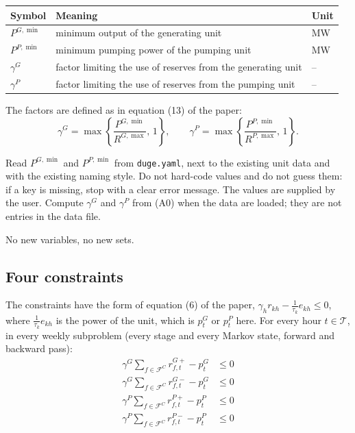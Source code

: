\documentclass[11pt,a4paper]{article}
\begin{document}
\begin{tabular}{@{}lll@{}}
\toprule
Symbol & Meaning & Unit\\
\midrule
$P^{G,\min}$ & minimum output of the generating unit & MW\\
$P^{P,\min}$ & minimum pumping power of the pumping unit & MW\\
$\gamma^G$ & factor limiting the use of reserves from the generating unit & --\\
$\gamma^P$ & factor limiting the use of reserves from the pumping unit & --\\
\bottomrule
\end{tabular}

The factors are defined as in equation (13) of the paper:
\begin{equation}
\gamma^G=\max\left\{\frac{P^{G,\min}}{R^{G,\max}},\,1\right\},\qquad
\gamma^P=\max\left\{\frac{P^{P,\min}}{R^{P,\max}},\,1\right\}.
\tag{A0}
\end{equation}

Read $P^{G,\min}$ and $P^{P,\min}$ from \texttt{duge.yaml}, next to the
existing unit data and with the existing naming style. Do not hard-code
values and do not guess them: if a key is missing, stop with a clear error
message. The values are supplied by the user. Compute $\gamma^G$ and
$\gamma^P$ from (A0) when the data are loaded; they are not entries in the
data file.

No new variables, no new sets.

\subsection{Four constraints}
The constraints have the form of equation (6) of the paper,
$\gamma_h r_{kh}-\tfrac{1}{\tau_k}e_{kh}\le 0$, where
$\tfrac{1}{\tau_k}e_{kh}$ is the power of the unit, which is $p^G_t$ or
$p^P_t$ here. For every hour $t\in\mathcal T$, in every weekly subproblem
(every stage and every Markov state, forward and backward pass):
\begin{align}
\gamma^G\sum_{f\in\mathcal F^C} r^{G+}_{f,t}-p^G_t &\le 0
  \tag{A1}\\
\gamma^G\sum_{f\in\mathcal F^C} r^{G-}_{f,t}-p^G_t &\le 0
  \tag{A2}\\
\gamma^P\sum_{f\in\mathcal F^C} r^{P+}_{f,t}-p^P_t &\le 0
  \tag{A3}\\
\gamma^P\sum_{f\in\mathcal F^C} r^{P-}_{f,t}-p^P_t &\le 0
  \tag{A4}
\end{align}
\end{document}
